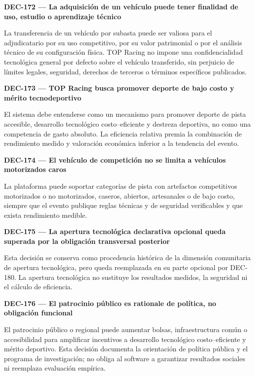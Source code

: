 \documentclass[10pt,letterpaper]{article}
\begin{document}
\noindent\textbf{DEC-172 --- La adquisición de un vehículo puede tener finalidad de uso, estudio o aprendizaje técnico}\par
La transferencia de un vehículo por subasta puede ser valiosa para el adjudicatario por su uso competitivo, por su valor patrimonial o por el análisis técnico de su configuración física. TOP Racing no impone una confidencialidad tecnológica general por defecto sobre el vehículo transferido, sin perjuicio de límites legales, seguridad, derechos de terceros o términos específicos publicados.\par\vspace{0.45em}
\noindent\textbf{DEC-173 --- TOP Racing busca promover deporte de bajo costo y mérito tecnodeportivo}\par
El sistema debe entenderse como un mecanismo para promover deporte de pista accesible, desarrollo tecnológico costo--eficiente y destreza deportiva, no como una competencia de gasto absoluto. La eficiencia relativa premia la combinación de rendimiento medido y valoración económica inferior a la tendencia del evento.\par\vspace{0.45em}
\noindent\textbf{DEC-174 --- El vehículo de competición no se limita a vehículos motorizados caros}\par
La plataforma puede soportar categorías de pista con artefactos competitivos motorizados o no motorizados, caseros, abiertos, artesanales o de bajo costo, siempre que el evento publique reglas técnicas y de seguridad verificables y que exista rendimiento medible.\par\vspace{0.45em}
\noindent\textbf{DEC-175 --- La apertura tecnológica declarativa opcional queda superada por la obligación transversal posterior}\par
Esta decisión se conserva como procedencia histórica de la dimensión comunitaria de apertura tecnológica, pero queda reemplazada en su parte opcional por DEC-180. La apertura tecnológica no sustituye los resultados medidos, la seguridad ni el cálculo de eficiencia.\par\vspace{0.45em}
\noindent\textbf{DEC-176 --- El patrocinio público es rationale de política, no obligación funcional}\par
El patrocinio público o regional puede aumentar bolsas, infraestructura común o accesibilidad para amplificar incentivos a desarrollo tecnológico costo--eficiente y mérito deportivo. Esta decisión documenta la orientación de política pública y el programa de investigación; no obliga al software a garantizar resultados sociales ni reemplaza evaluación empírica.\par\vspace{0.45em}
\end{document}
